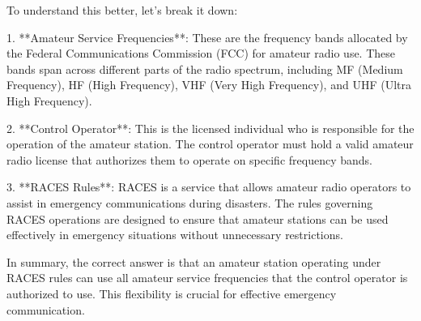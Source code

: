 To understand this better, let's break it down:

1. **Amateur Service Frequencies**: These are the frequency bands allocated by the Federal Communications Commission (FCC) for amateur radio use. These bands span across different parts of the radio spectrum, including MF (Medium Frequency), HF (High Frequency), VHF (Very High Frequency), and UHF (Ultra High Frequency).

2. **Control Operator**: This is the licensed individual who is responsible for the operation of the amateur station. The control operator must hold a valid amateur radio license that authorizes them to operate on specific frequency bands.

3. **RACES Rules**: RACES is a service that allows amateur radio operators to assist in emergency communications during disasters. The rules governing RACES operations are designed to ensure that amateur stations can be used effectively in emergency situations without unnecessary restrictions.

In summary, the correct answer is that an amateur station operating under RACES rules can use all amateur service frequencies that the control operator is authorized to use. This flexibility is crucial for effective emergency communication.

